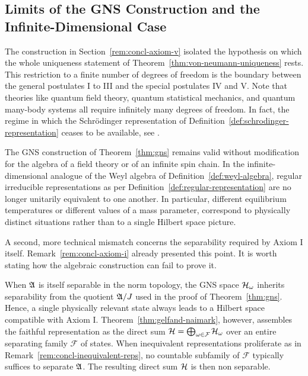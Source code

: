 	\subsection*{Limits of the GNS Construction and the Infinite-Dimensional Case} \label{sec:concl-limits}
	
	The construction in Section~\ref{rem:concl-axiom-v} isolated the hypothesis on which the whole uniqueness statement of Theorem~\ref{thm:von-neumann-uniqueness} rests. This restriction to a finite number of degrees of freedom is the boundary between the general postulates I to III and the special postulates IV and V. Note that theories like quantum field theory, quantum statistical mechanics, and quantum many-body systems all require infinitely many degrees of freedom. In fact, the regime in which the Schr\"odinger representation of Definition~\ref{def:schrodinger-representation} ceases to be available, see \cite[Sect.~3.6]{strocchiIntroductionMathematicalStructure2005}.
	
	\begin{remark}
		\label{rem:concl-inequivalent-reps}
		The GNS construction of Theorem~\ref{thm:gns} remains valid without modification for the algebra of a field theory or of an infinite spin chain. In the infinite-dimensional analogue of the Weyl algebra of Definition~\ref{def:weyl-algebra}, regular irreducible representations as per Definition~\ref{def:regular-representation} are no longer unitarily equivalent to one another. In particular, different equilibrium temperatures or different values of a mass parameter, correspond to physically distinct situations rather than to a single Hilbert space picture. 
	\end{remark}
	
	\noindent A second, more technical mismatch concerns the separability required by Axiom I itself. Remark~\ref{rem:concl-axiom-i} already presented this point. It is worth stating how the algebraic construction can fail to prove it.
	
	\begin{remark}[Separability]
		\label{rem:concl-separability}
		 When $\mathfrak{A}$ is itself separable in the norm topology, the GNS space $\H_\omega$ inherits separability from the quotient $\mathfrak{A}/J$ used in the proof of Theorem~\ref{thm:gns}. Hence, a single physically relevant state always leads to a Hilbert space compatible with Axiom I. Theorem~\ref{thm:gelfand-naimark}, however, assembles the faithful representation as the direct sum $\H=\bigoplus_{\omega\in\mathcal F}\H_\omega$ over an entire separating family $\mathcal F$ of states. When inequivalent representations proliferate as in Remark~\ref{rem:concl-inequivalent-reps}, no countable subfamily of $\mathcal F$ typically suffices to separate $\mathfrak{A}$. The resulting direct sum $\H$ is then non separable.
	\end{remark}
	
